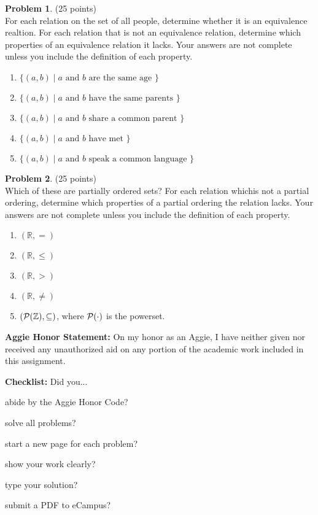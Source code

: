 \documentclass{article}
\theoremstyle{definition}
\newtheorem{problem}{Problem}
\newtheorem*{solution}{Solution}
\newcommand{\honor}{\noindent \textbf{Aggie Honor Statement: }On my honor as an Aggie, I have neither
  given nor received any unauthorized aid on any portion of the academic work included in this assignment.
}
\newcommand{\checklist}{\noindent\textbf{Checklist:}
Did you...
\begin{compactenum}
\item abide by the Aggie Honor Code?
\item solve all problems?
\item start a new page for each problem?
\item show your work clearly?
\item type your solution?
\item submit a PDF to eCampus?
\end{compactenum}
}
\begin{document}
\begin{problem} (25 points)\\
For each relation on the set of all people, determine whether it is an equivalence realtion.  For each relation that is not an equivalence relation, determine which properties of an equivalence relation it lacks.  Your answers are not complete unless you include the definition of each property.
\begin{enumerate}
\item $\{(a,b) \mid a \text{ and } b \text{ are the same age }\}$
\item $\{(a,b) \mid a \text{ and } b \text{ have the same parents }\}$
\item $\{(a,b) \mid a \text{ and } b \text{ share a common parent }\}$
\item $\{(a,b) \mid a \text{ and } b \text{ have met }\}$
\item $\{(a,b) \mid a \text{ and } b \text{ speak a common language }\}$
\end{enumerate}
\end{problem}


\begin{problem} (25 points)\\
Which of these are partially ordered sets?  For each relation whichis not a partial ordering, determine which properties of a partial ordering the relation lacks. Your answers are not complete unless you include the definition of each property.
\begin{enumerate}
\item $(\mathbb{R},=)$
\item $(\mathbb{R},\leq)$
\item $(\mathbb{R},>)$
\item $(\mathbb{R},\neq)$
\item $(\cal{P}(\mathbb{Z}),\subseteq)$, where $\cal{P}(\cdot)$ is the powerset.
\end{enumerate}
\end{problem}


\bigskip
\honor

\bigskip
\checklist
\end{document}
